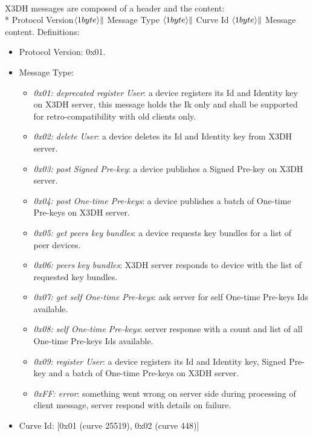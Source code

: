 \documentclass[a4paper,11pt]{article}
\begin{document}
    \paragraph*{}X3DH messages are composed of a header and the content:\\*
    Protocol Version$\langle 1byte\rangle \Arrowvert $ Message Type $\langle 1byte\rangle \Arrowvert $ Curve Id $\langle 1byte\rangle \Arrowvert $ Message content.
    Definitions:
      \begin{itemize}
      \item Protocol Version: 0x01.
      \item Message Type:
        \begin{itemize}
          \item \textit{0x01: deprecated register User}: a device registers its Id and Identity key on X3DH server, this message holds the Ik only and shall be supported for retro-compatibility with old clients only.
          \item \textit{0x02: delete User}: a device deletes its Id and Identity key from X3DH server.
          \item \textit{0x03: post Signed Pre-key}: a device publishes a Signed Pre-key on X3DH server.
          \item \textit{0x04: post One-time Pre-keys}: a device publishes a batch of One-time Pre-keys on X3DH server.
          \item \textit{0x05: get peers key bundles}: a device requests key bundles for a list of peer devices.
          \item \textit{0x06: peers key bundles}: X3DH server responds to device with the list of requested key bundles.
          \item \textit{0x07: get self One-time Pre-keys}: ask server for self One-time Pre-keys Ids available.
          \item \textit{0x08: self One-time Pre-keys}: server response with a count and list of all One-time Pre-keys Ids available.          
          \item \textit{0x09: register User}: a device registers its Id and Identity key, Signed Pre-key and a batch of One-time Pre-keys on X3DH server.
          \item \textit{0xFF: error}: something went wrong on server side during processing of client message, server respond with details on failure.
        \end{itemize}
      \item Curve Id: [0x01 (curve 25519), 0x02 (curve 448)]
      \end{itemize}
    
\end{document}
